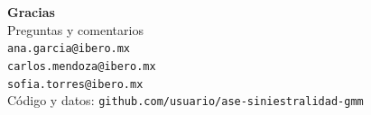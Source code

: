 \documentclass[aspectratio=169, 12pt]{beamer}
\begin{document}
\begin{frame}
  \centering
  \vspace{1em}
  {\Large \textbf{Gracias}}\\[1em]
  {\large Preguntas y comentarios}\\[2em]
  \small
  \texttt{ana.garcia@ibero.mx}\\
  \texttt{carlos.mendoza@ibero.mx}\\
  \texttt{sofia.torres@ibero.mx}\\[1em]
  Código y datos: \texttt{github.com/usuario/ase-siniestralidad-gmm}
\end{frame}
\end{document}
